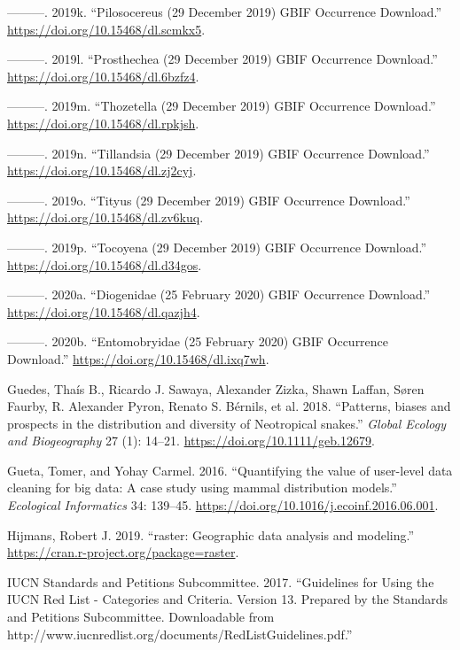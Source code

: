 \documentclass[fleqn,10pt,lineno]{wlpeerj} %
\begin{document}
\leavevmode\hypertarget{ref-GBIForg2019k}{}%
---------. 2019k. ``Pilosocereus (29 December 2019) GBIF Occurrence Download.'' \url{https://doi.org/10.15468/dl.scmkx5}.

\leavevmode\hypertarget{ref-GBIForg2019m}{}%
---------. 2019l. ``Prosthechea (29 December 2019) GBIF Occurrence Download.'' \url{https://doi.org/10.15468/dl.6bzfz4}.

\leavevmode\hypertarget{ref-GBIForg2019h}{}%
---------. 2019m. ``Thozetella (29 December 2019) GBIF Occurrence Download.'' \url{https://doi.org/10.15468/dl.rpkjsh}.

\leavevmode\hypertarget{ref-GBIForg2019o}{}%
---------. 2019n. ``Tillandsia (29 December 2019) GBIF Occurrence Download.'' \url{https://doi.org/10.15468/dl.zj2cyj}.

\leavevmode\hypertarget{ref-GBIForg2019b}{}%
---------. 2019o. ``Tityus (29 December 2019) GBIF Occurrence Download.'' \url{https://doi.org/10.15468/dl.zv6kuq}.

\leavevmode\hypertarget{ref-GBIForg2019l}{}%
---------. 2019p. ``Tocoyena (29 December 2019) GBIF Occurrence Download.'' \url{https://doi.org/10.15468/dl.d34gos}.

\leavevmode\hypertarget{ref-GBIForg2020}{}%
---------. 2020a. ``Diogenidae (25 February 2020) GBIF Occurrence Download.'' \url{https://doi.org/10.15468/dl.qazjh4}.

\leavevmode\hypertarget{ref-GBIForg2020a}{}%
---------. 2020b. ``Entomobryidae (25 February 2020) GBIF Occurrence Download.'' \url{https://doi.org/10.15468/dl.ixq7wh}.

\leavevmode\hypertarget{ref-Guedes2018}{}%
Guedes, Thaís B., Ricardo J. Sawaya, Alexander Zizka, Shawn Laffan, Søren Faurby, R. Alexander Pyron, Renato S. Bérnils, et al. 2018. ``Patterns, biases and prospects in the distribution and diversity of Neotropical snakes.'' \emph{Global Ecology and Biogeography} 27 (1): 14--21. \url{https://doi.org/10.1111/geb.12679}.

\leavevmode\hypertarget{ref-Gueta2016}{}%
Gueta, Tomer, and Yohay Carmel. 2016. ``Quantifying the value of user-level data cleaning for big data: A case study using mammal distribution models.'' \emph{Ecological Informatics} 34: 139--45. \url{https://doi.org/10.1016/j.ecoinf.2016.06.001}.

\leavevmode\hypertarget{ref-Hijmans2019}{}%
Hijmans, Robert J. 2019. ``raster: Geographic data analysis and modeling.'' \url{https://cran.r-project.org/package=raster}.

\leavevmode\hypertarget{ref-IUCN2017}{}%
IUCN Standards and Petitions Subcommittee. 2017. ``Guidelines for Using the IUCN Red List - Categories and Criteria. Version 13. Prepared by the Standards and Petitions Subcommittee. Downloadable from http://www.iucnredlist.org/documents/RedListGuidelines.pdf.''
\end{document}

